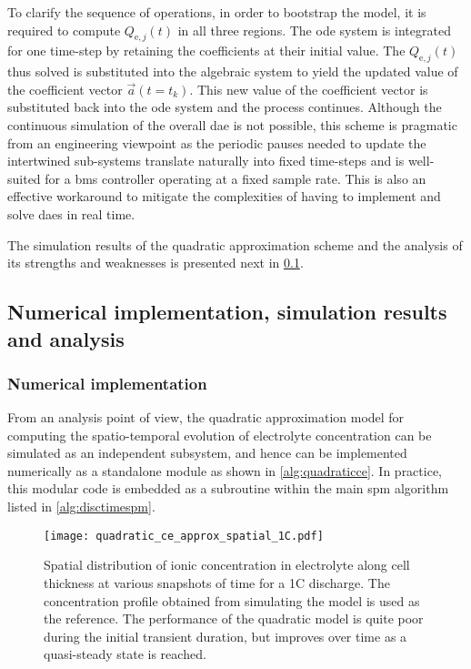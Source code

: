 To clarify the  sequence of operations, in  order to bootstrap the  model, it is
required  to compute  $Q_{\text{e},j}(t)$ in  all three  regions. The  \gls{ode}
system  is  integrated  for  one  time-step by  retaining  the  coefficients  at
their initial  value. The  $Q_{\text{e},j}(t)$ thus  solved is  substituted into
the  algebraic system  to  yield the  updated value  of  the coefficient  vector
$\vec{a}(t=t_k)$. This new  value of the coefficient vector  is substituted back
into the  \gls{ode} system  and the process  continues. Although  the continuous
simulation of  the overall \gls{dae} is  not possible, this scheme  is pragmatic
from  an engineering  viewpoint  as the  periodic pauses  needed  to update  the
intertwined  sub-systems  translate  naturally  into  fixed  time-steps  and  is
well-suited for a \gls{bms} controller operating at a fixed sample rate. This is
also an effective workaround to mitigate the complexities of having to implement
and solve \glspl{dae} in real time.

The   simulation   results   of   the   quadratic   approximation   scheme   and
the   analysis   of   its   strengths   and   weaknesses   is   presented   next
in \cref{subsec:quadraticsimresultsanalysis}.

\subsection{Numerical implementation, simulation results and analysis}\label{subsec:quadraticsimresultsanalysis}

\subsubsection*{Numerical implementation}
From an analysis point of view,  the quadratic approximation model for computing
the spatio-temporal evolution  of electrolyte concentration can  be simulated as
an  independent  subsystem,  and  hence  can be  implemented  numerically  as  a
standalone module as shown  in \cref{alg:quadraticce}. In practice, this modular
code is  embedded as  a subroutine  within the  main \gls{spm}  algorithm listed
in \cref{alg:disctimespm}.



\begin{figure}[!htb]
    \centering
    \texttt{[image: quadratic\_ce\_approx\_spatial\_1C.pdf]}
    \caption[Spatial distribution of electrolyte concentration for 1C
    discharge]{Spatial distribution of ionic concentration in electrolyte along
        cell thickness at various snapshots of time for a 1C discharge. The
        concentration profile obtained from simulating the 
        model is used as the reference. The performance of the quadratic model
        is quite poor during the initial transient duration, but improves over
    time as a quasi-steady state is reached.}
    \label{fig:spatialionicconc1C}
\end{figure}


